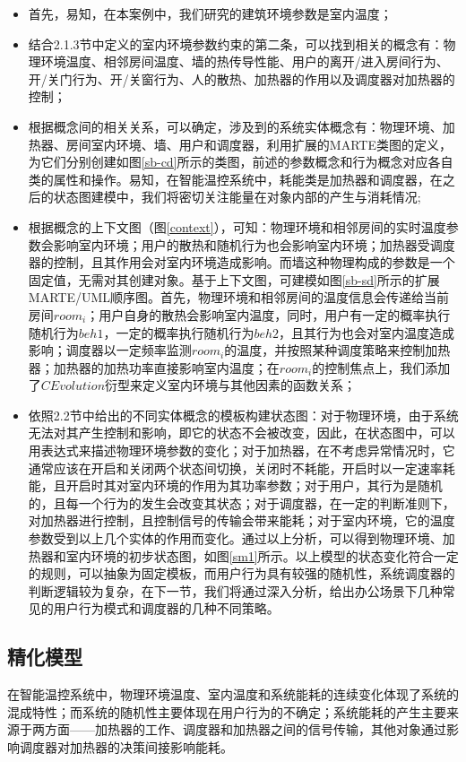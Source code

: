 	\begin{itemize}
	\item 首先，易知，在本案例中，我们研究的建筑环境参数是室内温度；
	\item 结合2.1.3节中定义的室内环境参数约束的第二条，可以找到相关的概念有：物理环境温度、相邻房间温度、墙的热传导性能、用户的离开/进入房间行为、开/关门行为、开/关窗行为、人的散热、加热器的作用以及调度器对加热器的控制；
	\item 根据概念间的相关关系，可以确定，涉及到的系统实体概念有：物理环境、加热器、房间室内环境、墙、用户和调度器，利用扩展的MARTE类图的定义，为它们分别创建如图\ref{sb-cd}所示的类图，前述的参数概念和行为概念对应各自类的属性和操作。易知，在智能温控系统中，耗能类是加热器和调度器，在之后的状态图建模中，我们将密切关注能量在对象内部的产生与消耗情况;
	\item 根据概念的上下文图（图\ref{context}），可知：物理环境和相邻房间的实时温度参数会影响室内环境；用户的散热和随机行为也会影响室内环境；加热器受调度器的控制，且其作用会对室内环境造成影响。而墙这种物理构成的参数是一个固定值，无需对其创建对象。基于上下文图，可建模如图\ref{sb-sd}所示的扩展MARTE/UML顺序图。首先，物理环境和相邻房间的温度信息会传递给当前房间$room_{i}$；用户自身的散热会影响室内温度，同时，用户有一定的概率执行随机行为$beh1$，一定的概率执行随机行为$beh2$，且其行为也会对室内温度造成影响；调度器以一定频率监测$room_{i}$的温度，并按照某种调度策略来控制加热器；加热器的加热功率直接影响室内温度；在$room_{i}$的控制焦点上，我们添加了$CEvolution$衍型来定义室内环境与其他因素的函数关系；
	\item 依照2.2节中给出的不同实体概念的模板构建状态图：对于物理环境，由于系统无法对其产生控制和影响，即它的状态不会被改变，因此，在状态图中，可以用表达式来描述物理环境参数的变化；对于加热器，在不考虑异常情况时，它通常应该在开启和关闭两个状态间切换，关闭时不耗能，开启时以一定速率耗能，且开启时其对室内环境的作用为其功率参数；对于用户，其行为是随机的，且每一个行为的发生会改变其状态；对于调度器，在一定的判断准则下，对加热器进行控制，且控制信号的传输会带来能耗；对于室内环境，它的温度参数受到以上几个实体的作用而变化。通过以上分析，可以得到物理环境、加热器和室内环境的初步状态图，如图\ref{sm1}所示。以上模型的状态变化符合一定的规则，可以抽象为固定模板，而用户行为具有较强的随机性，系统调度器的判断逻辑较为复杂，在下一节，我们将通过深入分析，给出办公场景下几种常见的用户行为模式和调度器的几种不同策略。
	\end{itemize}

\subsection{精化模型}
	在智能温控系统中，物理环境温度、室内温度和系统能耗的连续变化体现了系统的混成特性；而系统的随机性主要体现在用户行为的不确定；系统能耗的产生主要来源于两方面——加热器的工作、调度器和加热器之间的信号传输，其他对象通过影响调度器对加热器的决策间接影响能耗。	
	
